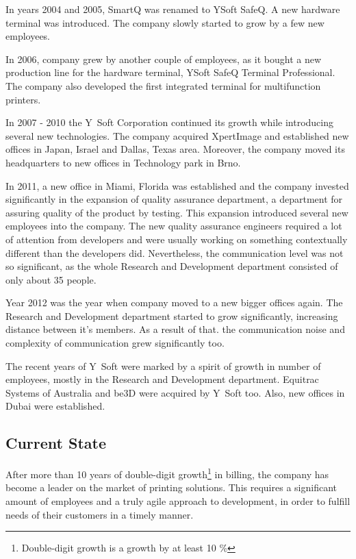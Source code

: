 \documentclass[11pt,singleside]{myfithesis2}
\begin{document}
In years 2004 and 2005, SmartQ was renamed to YSoft SafeQ. A new hardware terminal was introduced. The company slowly started to grow by a few new employees.

In 2006, company grew by another couple of employees, as it bought a new production line for the hardware terminal, YSoft SafeQ Terminal Professional. The company also developed the first integrated terminal for multifunction printers.

In 2007 - 2010 the Y~Soft Corporation continued its growth while introducing several new technologies. The company acquired XpertImage and established new offices in Japan, Israel and Dallas, Texas area. Moreover, the company moved its headquarters to new offices in Technology park in Brno.

In 2011, a new office in Miami, Florida was established and the company invested significantly in the expansion of quality assurance department, a department for assuring quality of the product by testing. This expansion introduced several new employees into the company. The new quality assurance engineers required a lot of attention from developers and were usually working on something contextually different than the developers did. Nevertheless, the communication level was not so significant, as the whole Research and Development department consisted of only about 35 people.

Year 2012 was the year when company moved to a new bigger offices again. The Research and Development department started to grow significantly, increasing distance between it's members. As a result of that. the communication noise and complexity of communication grew significantly too. 

The recent years of Y~Soft were marked by a spirit of growth in number of employees, mostly in the Research and Development department. Equitrac Systems of Australia and be3D were acquired by Y~Soft too. Also, new offices in Dubai were established.

		\subsection{Current State}\label{currentState}
After more than 10 years of double-digit growth\footnote{Double-digit growth is a growth by at least 10 \%} in billing, the company has become a leader on the market of printing solutions. This requires a significant amount of employees and a truly agile approach to development, in order to fulfill needs of their customers in a timely manner. 
\end{document}
